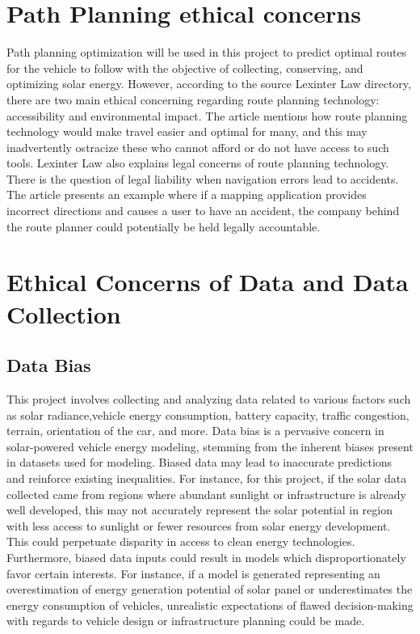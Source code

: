 \documentclass[10pt,twocolumn]{article}
\begin{document}
\section{Path Planning ethical concerns}
Path planning optimization will be used in this project to predict optimal routes for the vehicle to follow  with the objective of collecting, conserving, and optimizing solar energy. However, according to the source Lexinter Law directory, there are two main ethical concerning regarding route planning technology: accessibility and environmental impact. The article mentions how route planning technology would make travel easier and optimal for many, and this may inadvertently ostracize these who cannot afford or do not have access to such tools. Lexinter Law also explains legal concerns of route planning technology. There is the question of legal liability when navigation errors lead to accidents. The article presents an example where if a mapping application provides incorrect directions and causes a user to have an accident, the company behind the route planner could potentially be held legally accountable.

\section{Ethical Concerns of Data and Data Collection}

\subsection{Data Bias}
This project involves collecting and analyzing data related to various factors such as solar radiance,vehicle energy consumption, battery capacity, traffic congestion, terrain, orientation of the car,  and more. Data bias is a pervasive concern in solar-powered vehicle energy modeling, stemming from the inherent biases present in datasets used for modeling. Biased data may lead to inaccurate predictions and reinforce existing inequalities. For instance, for this project, if the solar data collected came from regions where abundant sunlight or infrastructure is already well developed, this may not accurately represent the solar potential in region with less access to sunlight or fewer resources from solar energy development. This could perpetuate disparity in access to clean energy technologies. Furthermore, biased data inputs could result in models which disproportionately favor certain interests. For instance, if a model is generated representing an overestimation of energy generation potential of solar panel or underestimates the energy consumption of vehicles, unrealistic expectations of flawed decision-making with regards to vehicle design or infrastructure planning could be made. 
 
\end{document}
